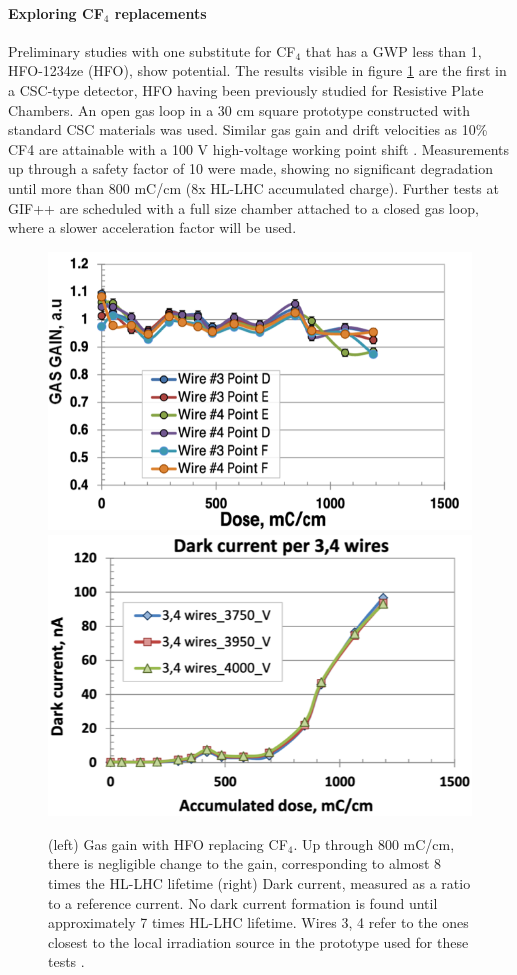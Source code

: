 \documentclass[a4paper,11pt]{article}
\begin{document}
\paragraph{Exploring CF$_4$ replacements}
Preliminary studies with one substitute for CF$_4$ that has a GWP less than 1, HFO-1234ze (HFO), show potential. 
The results visible in figure \ref{fig:PerformanceHFO} are the first in a CSC-type detector, HFO having been previously studied for Resistive Plate Chambers. 
An open gas loop in a 30 cm square prototype constructed with standard CSC materials was used.
Similar gas gain and drift velocities as 10\% CF4 are attainable with a 100 V high-voltage working point shift \cite{aging}. Measurements up through a safety factor of 10 were made, showing no significant degradation until more than 800 mC/cm (8x HL-LHC accumulated charge).
Further tests at GIF++ are scheduled with a full size chamber attached to a closed gas loop, where a slower acceleration factor will be used.
\begin{figure}[htbp]
\centering %
\includegraphics[width=.45\textwidth]{GainHFO.png}
\qquad
\includegraphics[width=.45\textwidth]{DarkCurrentHFO.png}
\caption{\label{fig:PerformanceHFO} (left) Gas gain with HFO replacing CF$_4$. Up through 800 mC/cm, there is negligible change to the gain, corresponding to almost 8 times the HL-LHC lifetime \cite{hfo} (right) Dark current, measured as a ratio to a reference current. No dark current formation is found until approximately 7 times HL-LHC lifetime. Wires 3, 4 refer to the ones closest to the local irradiation source in the prototype used for these tests \cite{hfo}.}
\end{figure}
\end{document}
